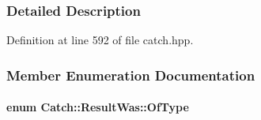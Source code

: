 \subsubsection{Detailed Description}


Definition at line 592 of file catch.\+hpp.



\subsubsection{Member Enumeration Documentation}
\hypertarget{a00069_a624e1ee3661fcf6094ceef1f654601ef}{}
\paragraph[{Of\+Type}]{\setlength{\rightskip}{0pt plus 5cm}enum {\bf Catch\+::\+Result\+Was\+::\+Of\+Type}}\label{a00069_a624e1ee3661fcf6094ceef1f654601ef}
